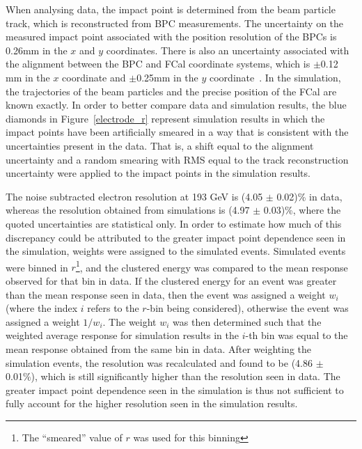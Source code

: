When analysing data, the impact point is determined from the beam particle track, which is reconstructed from BPC measurements. The uncertainty on the measured impact point associated with the position resolution of the BPCs is 0.26mm in the $x$ and $y$ coordinates. There is also an uncertainty associated with the alignment between the BPC and FCal coordinate systems, which is $\pm$0.12 mm in the $x$ coordinate and $\pm$0.25mm in the $y$ coordinate~\cite{LouiseThesis}. In the simulation, the trajectories of the beam particles and the precise position of the FCal are known exactly. In order to better compare data and simulation results, the blue diamonds in Figure~\ref{electrode_r} represent simulation results in which the impact points have been artificially smeared in a way that is consistent with the uncertainties present in the data. That is, a shift equal to the alignment uncertainty and a random smearing with RMS equal to the track reconstruction uncertainty were applied to the impact points in the simulation results. 

The noise subtracted electron resolution at 193 GeV is (4.05 $\pm$ 0.02)\% in data, whereas the resolution obtained from simulations is (4.97 $\pm$ 0.03)\%, where the quoted uncertainties are statistical only. In order to estimate how much of this discrepancy could be attributed to the greater impact point dependence seen in the simulation, weights were assigned to the simulated events. Simulated events were binned in $r$\footnote{The ``smeared'' value of $r$ was used for this binning}, and the clustered energy was compared to the mean response observed for that bin in data. If the clustered energy for an event was greater than the mean response seen in data, then the event was assigned a weight $w_i$ (where the index $i$ refers to the $r$-bin being considered), otherwise the event was assigned a weight $1/w_i$. The weight $w_i$ was then determined such that the weighted average response for simulation results in the $i$-th bin was equal to the mean response obtained from the same bin in data.  After weighting the simulation events, the resolution was recalculated and found to be (4.86 $\pm$ 0.01\%), which is still significantly higher than the resolution seen in data. The greater impact point dependence seen in the simulation is thus not sufficient to fully account for the higher resolution seen in the simulation results. 

%
%
%
%
%
%
%
%
%
%
%


